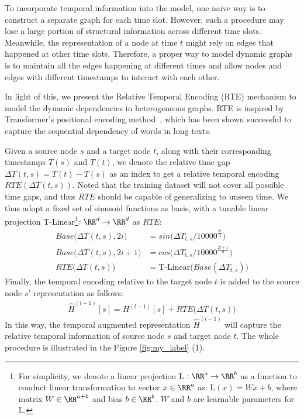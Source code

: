 \documentclass[sigconf]{acmart}
\theoremstyle{definition}
\begin{document}
{To incorporate temporal information into the model, one naive way is to construct a separate graph for each time slot. However, such a procedure may lose a large portion of structural information across different time slots. 
Meanwhile, the representation of a node at time $t$ might rely on edges that happened at other time slots. 
Therefore, a proper way to model dynamic graphs is to maintain all the edges happening at different times and allow nodes and edges with different timestamps to interact with each other.

In light of this, we present the Relative Temporal Encoding (RTE) mechanism to model the dynamic dependencies in heterogeneous graphs. 
RTE is inspired by Transformer's positional encoding method~\cite{DBLP:conf/nips/VaswaniSPUJGKP17, DBLP:conf/naacl/ShawUV18}, which has been shown successful to capture the sequential dependency of words in long texts. 

Given a source node $s$ and a target node $t$, along with their corresponding timestamps $T(s)$ and $T(t)$, we denote the relative time gap $\Delta T(t,s) = T(t) - T(s)$ as an index to get a relative temporal encoding $RTE(\Delta T(t,s))$. Noted that the training dataset will not cover all possible time gaps, and thus  $RTE$ should be capable of generalizing to unseen time. We thus adopt a fixed set of sinusoid functions as basis, with a tunable linear projection T-Linear\footnote{For simplicity, we denote a linear projection L $:\RR^{a}\rightarrow \RR^{b}$ as a function to conduct linear transformation to vector $x\in\RR^{a}$ as: L$(x)=Wx+b$, where matrix $W\in\RR^{a+b}$ and bias $b\in\RR^{b}$. $W$ and $b$ are learnable parameters for L.}$: \RR^{d} \rightarrow \RR^{d}$ as $RTE$:
\begin{align}
   Base\big(\Delta T(t,s), 2i\big) & = sin\Big(\Delta T_{t,s} / 10000^{\frac{2i}{d}}\Big)\\ 
   Base\big(\Delta T(t,s), 2i+1\big) & = cos\Big(\Delta T_{t,s} / 10000^{\frac{2i+1}{d}}\Big)\\ 
   RTE\big(\Delta T(t,s)\big) & = \text{T-Linear}\Big( Base(\Delta T_{t,s}) \Big)
\end{align}
Finally, the temporal encoding relative to the target node $t$ is added to the source node $s$' representation as follows:
\begin{align}
    \widehat{H}^{(l-1)}[s] = H^{(l-1)}[s] + RTE\big(\Delta T(t,s)\big)
\end{align}
In this way, the temporal augmented representation $\widehat{H}^{(l-1)}$ will capture the relative temporal information of source node $s$ and target node $t$. The whole procedure is illustrated in the Figure \ref{fig:my_label} (1). 



}
\end{document}
